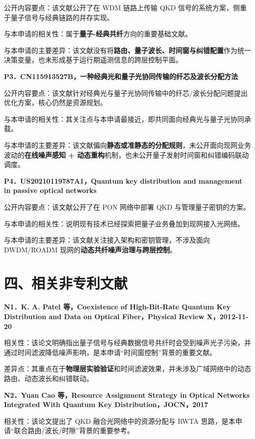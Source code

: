 \documentclass[12pt,a4paper]{article}
\begin{document}
公开内容要点：该文献公开了在 WDM 链路上传输 QKD 信号的系统方案，侧重于量子信号与经典链路的并存实现。

与本申请的相关性：属于\textbf{量子-经典共纤}方向的重要基础文献。

与本申请的主要差异：该文献没有将\textbf{路由、量子波长、时间窗与纠错配置}作为统一决策变量，也未形成基于运行期遥测信息的跨层控制平面。

\vspace{0.5em}
\textbf{P3．CN115913527B，一种经典光和量子光协同传输的纤芯及波长分配方法}

公开内容要点：该文献针对经典光与量子光协同传输中的纤芯/波长分配问题提出优化方案，核心仍然是资源规划。

与本申请的相关性：其关注点与本申请最接近，即共同面向经典光与量子光协同承载。

与本申请的主要差异：该文献偏向\textbf{静态或准静态的分配规则}，未公开面向现网业务波动的\textbf{在线噪声感知 + 动态重构}机制，也未公开量子发射时间窗和纠错编码联动调度。

\vspace{0.5em}
\textbf{P4．US20210119787A1，Quantum key distribution and management in passive optical networks}

公开内容要点：该文献公开了在 PON 网络中部署 QKD 与管理量子密钥的方案。

与本申请的相关性：说明现有技术已经探索把量子业务叠加到现网接入光网络。

与本申请的主要差异：该文献关注接入架构和密钥管理，不涉及面向 DWDM/ROADM 现网的\textbf{动态共纤噪声治理与跨层控制}。

\section*{四、相关非专利文献}

\textbf{N1．K. A. Patel 等，Coexistence of High-Bit-Rate Quantum Key Distribution and Data on Optical Fiber，Physical Review X，2012-11-20}

相关性：该论文明确指出量子信号与经典数据信号共纤时会受到噪声光子污染，并通过时间滤波降低噪声影响，是本申请“时间窗控制”背景的重要文献。

差异点：其重点在于\textbf{物理层实验验证}和时间滤波效果，并未涉及广域网络中的动态路由、动态波长和纠错联动。

\vspace{0.5em}
\textbf{N2．Yuan Cao 等，Resource Assignment Strategy in Optical Networks Integrated With Quantum Key Distribution，JOCN，2017}

相关性：该论文提出了 QKD 融合光网络中的资源分配与 RWTA 思路，是本申请“联合路由/波长/时隙”背景的重要参考。
\end{document}
